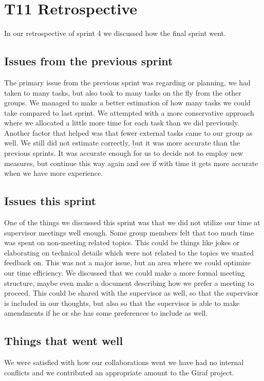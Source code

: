 \section{\gls{T11} Retrospective}

In our retrospective of sprint 4 we discussed how the final sprint went.

\subsection{Issues from the previous sprint}
The primary issue from the previous sprint was regarding or planning, we had taken to many tasks, but also took to many tasks on the fly from the other groups.
We managed to make a better estimation of how many tasks we could take compared to last sprint. We attempted with a more conservative approach where we allocated a little more time for each task than we did previously. Another factor that helped was that fewer external tasks came to our group as well. We still did not estimate correctly, but it was more accurate than the previous sprints. It was accurate enough for us to decide not to employ new measures, but continue this way again and see if with time it gets more accurate when we have more experience.

\subsection{Issues this sprint}
One of the things we discussed this sprint was that we did not utilize our time at supervisor meetings well enough. Some group members felt that too much time was spent on non-meeting related topics. This could be things like jokes or elaborating on technical details which were not related to the topics we wanted feedback on. This was not a major issue, but an area where we could optimize our time efficiency.
We discussed that we could make a more formal meeting structure, maybe even make a document describing how we prefer a meeting to proceed. This could be shared with the supervisor as well, so that the supervisor is included in our thoughts, but also so that the supervisor is able to make amendments if he or she has some preferences to include as well.

\subsection{Things that went well}
We were satisfied with how our collaborations went we have had no internal conflicts and we contributed an appropriate amount to the Giraf project. 
